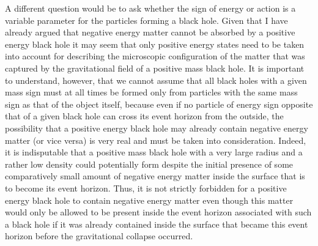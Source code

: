 \documentclass[notitlepage,12pt]{report}
\begin{document}
A different question would be to ask whether the sign of energy or action is a variable parameter for the particles forming a black hole. Given that I have already argued that negative energy matter cannot be absorbed by a positive energy black hole it may seem that only positive energy states need to be taken into account for describing the microscopic configuration of the matter that was captured by the gravitational field of a positive mass black hole. It is important to understand, however, that we cannot assume that all black holes with a given mass sign must at all times be formed only from particles with the same mass sign as that of the object itself, because even if no particle of energy sign opposite that of a given black hole can cross its event horizon from the outside, the possibility that a positive energy black hole may already contain negative energy matter (or vice versa) is very real and must be taken into consideration. Indeed, it is indisputable that a positive mass black hole with a very large radius and a rather low density could potentially form despite the initial presence of some comparatively small amount of negative energy matter inside the surface that is to become its event horizon. Thus, it is not strictly forbidden for a positive energy black hole to contain negative energy matter even though this matter would only be allowed to be present inside the event horizon associated with such a black hole if it was already contained inside the surface that became this event horizon before the gravitational collapse occurred.
\end{document}
